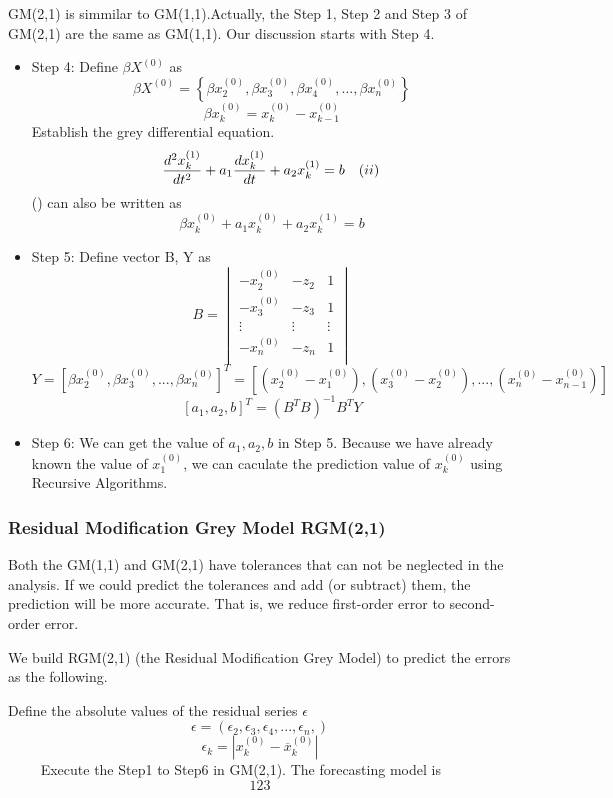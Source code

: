 \documentclass{mcmthesis}
\begin{document}
GM(2,1) is simmilar to GM(1,1).Actually, the Step 1, Step 2 and Step 3 of GM(2,1) are the same as GM(1,1). Our discussion starts with Step 4.
	\begin{itemize}
		\item Step 4: 
			Define $\beta X^{(0)}$ as
			$$
				\beta X^{(0)} = \left\{\beta x^{(0)}_2,\beta x^{(0)}_3,\beta x^{(0)}_4,...,\beta x^{(0)}_n \right\}
			$$
			$$
				\beta x^{(0)}_k = x^{(0)}_k - x^{(0)}_{k-1}
			$$
			Establish the grey differential equation.
			$$
			\frac{d^2x^{(1)}_k}{dt^2}+ a_1\frac{dx^{(1)}_k}{dt} + a_2x^{(1)}_k = b\quad (\uppercase\expandafter{\romannumeral2})
			$$
		 (\uppercase\expandafter{}) can also be written as 
		 $$
		 	\beta x^{(0)}_k+a_1x^{(0)}_k + a_2x^{(1)}_k = b
		 $$
		\item Step 5: Define vector B, Y as
		$$B = 
			\begin{vmatrix}
				-x^{(0)}_2 & -z_2 & 1\\
				-x^{(0)}_3 & -z_3 & 1\\
				\vdots & \vdots & \vdots\\
				-x^{(0)}_n & -z_n & 1\\
			\end{vmatrix}
		$$
		$$
		 	Y = [\beta x^{(0)}_2,\beta x^{(0)}_3,...,\beta x^{(0)}_n ]^T = [(x^{(0)}_2 - x^{(0)}_1), (x^{(0)}_3 - x^{(0)}_2),...,(x^{(0)}_n - x^{(0)}_{n-1})]
		$$
		$$
			[a_1,a_2,b]^T = (B^TB)^{-1}B^TY
		$$
		\item Step 6: We can get the value of $a_1,a_2,b$ in Step 5. Because we have already known the value of $x^{(0)}_1$, we can caculate the prediction value of $x^{(0)}_k$ using Recursive Algorithms.
	\end{itemize}

\subsubsection{Residual Modification Grey Model RGM(2,1)}
	Both the GM(1,1) and GM(2,1) have tolerances that can not be neglected in the analysis. If we could predict the tolerances and add (or subtract) them, the prediction will be more accurate. That is, we reduce first-order error to second-order error.

	We build RGM(2,1) (the Residual Modification Grey Model) to predict the errors as the following.

	Define the absolute values of the residual series $\epsilon$
	$$
		\epsilon = \left(\epsilon_2,\epsilon_3,\epsilon_4,...,\epsilon_n, \right)
	$$
	$$
		\epsilon_k = \left|x^{(0)}_k - \overline x^{(0)}_k \right|
	$$
	$\qquad$ Execute the Step1 to Step6 in GM(2,1). The forecasting model is
	$$
		123
	$$
\fi
\end{document}
